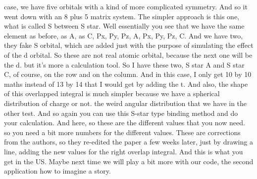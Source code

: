 case, we have five orbitals with a kind of more complicated symmetry. And so it went down with an 8 plus 5 matrix system.
The simpler approach is this one, what is called S between S star. Well essentially you see that we have the same element as before, as A, as C, Px, Py, Pz, A, Px, Py, Pz, C. And we have two, they fake S orbital, which are added just with the purpose of simulating the effect of the d orbital. So these are not real atomic orbital, because the next one will be the d. but it's more a calculation tool. So I have these two, S star A and S star C, of course, on the row and on the column. And in this case, I only get 10 by 10 maths instead of 13 by 14 that I would get by adding the t. And also, the shape of this overlapped integral is much simpler because we have a spherical distribution of charge or not. the weird angular distribution that we have in the other test. And so again you can use this S-star type binding method and do your calculation. And here, so these are the different values that you now need. so you need a bit more numbers for the different values. These are corrections from the authors, so they re-edited the paper a few weeks later, just by drawing a line, adding the new values for the right overlap integral. And this is what you get in the US. Maybe next time we will play a bit more with our code, the second application how to imagine a story.
